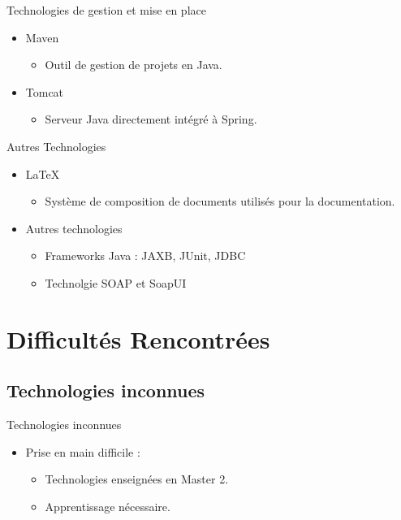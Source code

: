 \documentclass{beamer}
\begin{document}
\begin{frame}{Technologies de gestion et mise en place}
\begin{itemize}
  \item Maven
     \begin{itemize}
        \item
        	Outil de gestion de projets en Java.
     \end{itemize}
  \item Tomcat
    \begin{itemize}
      \item
       Serveur Java directement intégré à Spring. 
    \end{itemize}
\end{itemize}
\end{frame}

\begin{frame}{Autres Technologies}
\begin{itemize}
  \item \LaTeX
     \begin{itemize}
        \item
           Système de composition de documents utilisés pour la documentation.
     \end{itemize}
  \item Autres technologies
    \begin{itemize}
      \item
       Frameworks Java : JAXB, JUnit, JDBC
     \item
       Technolgie SOAP et SoapUI
    \end{itemize}
\end{itemize}
\end{frame}

\section{Difficultés Rencontrées}

\subsection{Technologies inconnues}

\begin{frame}{Technologies inconnues}
\begin{itemize}
  \item Prise en main difficile :
     \begin{itemize}
          \item Technologies enseignées en Master 2.
          \item Apprentissage nécessaire.
    \end{itemize}
\end{itemize}
\end{frame}
\end{document}
